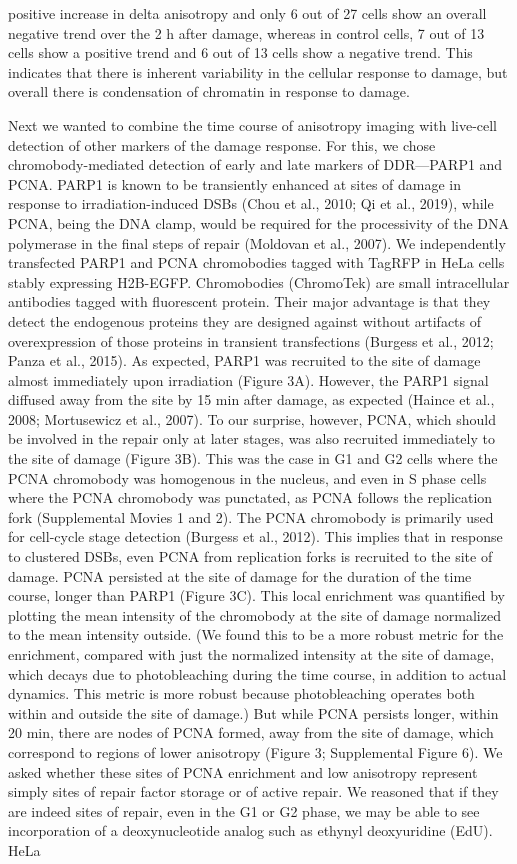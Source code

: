 positive increase in delta anisotropy and only 6 out of 27 cells show an overall negative trend over the 2 h after damage, whereas in control cells, 7 out of 13 cells show a positive trend and 6 out of 13 cells show a negative trend. This indicates that there is inherent variability in the cellular response to damage, but overall there is condensation of chromatin in response to damage.

Next we wanted to combine the time course of anisotropy imaging with live-cell detection of other markers of the damage response. For this, we chose chromobody-mediated detection of early and late markers of DDR—PARP1 and PCNA. PARP1 is known to be transiently enhanced at sites of damage in response to irradiation-induced DSBs (Chou et al., 2010; Qi et al., 2019), while PCNA, being the DNA clamp, would be required for the processivity of the DNA polymerase in the final steps of repair (Moldovan et al., 2007). We independently transfected PARP1 and PCNA chromobodies tagged with TagRFP in HeLa cells stably expressing H2B-EGFP. Chromobodies (ChromoTek) are small intracellular antibodies tagged with fluorescent protein. Their major advantage is that they detect the endogenous proteins they are designed against without artifacts of overexpression of those proteins in transient transfections (Burgess et al., 2012; Panza et al., 2015). As expected, PARP1 was recruited to the site of damage almost immediately upon irradiation (Figure 3A). However, the PARP1 signal diffused away from the site by 15 min after damage, as expected (Haince et al., 2008; Mortusewicz et al., 2007). To our surprise, however, PCNA, which should be involved in the repair only at later stages, was also recruited immediately to the site of damage (Figure 3B). This was the case in G1 and G2 cells where the PCNA chromobody was homogenous in the nucleus, and even in S phase cells where the PCNA chromobody was punctated, as PCNA follows the replication fork (Supplemental Movies 1 and 2). The PCNA chromobody is primarily used for cell-cycle stage detection (Burgess et al., 2012). This implies that in response to clustered DSBs, even PCNA from replication forks is recruited to the site of damage. PCNA persisted at the site of damage for the duration of the time course, longer than PARP1 (Figure 3C). This local enrichment was quantified by plotting the mean intensity of the chromobody at the site of damage normalized to the mean intensity outside. (We found this to be a more robust metric for the enrichment, compared with just the normalized intensity at the site of damage, which decays due to photobleaching during the time course, in addition to actual dynamics. This metric is more robust because photobleaching operates both within and outside the site of damage.) But while PCNA persists longer, within 20 min, there are nodes of PCNA formed, away from the site of damage, which correspond to regions of lower anisotropy (Figure 3; Supplemental Figure 6). We asked whether these sites of PCNA enrichment and low anisotropy represent simply sites of repair factor storage or of active repair. We reasoned that if they are indeed sites of repair, even in the G1 or G2 phase, we may be able to see incorporation of a deoxynucleotide analog such as ethynyl deoxyuridine (EdU). HeLa 